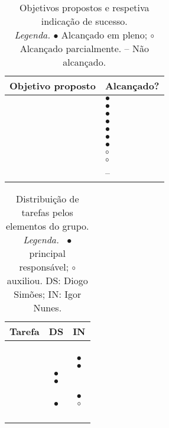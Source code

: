 \begin{table}[!htbp]
	\centering
	\begin{tabular}{p{} >{\centering\let\newline\\\arraybackslash\hspace{0pt}}m{}}
		\toprule
		{\bfseries Objetivo proposto} & {\bfseries Alcançado?} \\
		\midrule
		 & $\bullet$ \\
		 & $\bullet$ \\
		 & $\bullet$ \\
		 & $\bullet$ \\
		 & $\bullet$ \\
		 & $\bullet$ \\
		 & $\bullet$ \\
		 & $\circ$   \\
		 & $\circ$   \\
		 & --        \\
		\bottomrule
	\end{tabular}
	\caption[Objetivos propostos vs. alcançados]{
		Objetivos propostos e respetiva indicação de sucesso.\\
		\textit{Legenda.} $\bullet$ Alcançado em pleno; $\circ$ Alcançado parcialmente. -- Não alcançado.
	}
	\label{tab::objetivos}
\end{table}


\begin{table}[!htbp]
	\centering
	\begin{tabular}{l c c}
		\toprule
		\textbf{Tarefa} & \textbf{DS} & \textbf{IN} \\
		\midrule
		 &             &             \\
		 &             &             \\
		 &             &             \\
		 &             &             \\
		 &             & $\bullet$   \\
		 &             & $\bullet$   \\
		 & $\bullet$   &             \\
		 & $\bullet$   &             \\
		 &             &             \\
		 &             &             \\
		 &             & $\bullet$   \\
		 & $\bullet$   & $\circ$     \\
		 &             &             \\
		 &             &             \\
		 &             &             \\
		 &             &             \\
		\bottomrule
	\end{tabular}
	\caption[Distribuição de tarefas]{
		Distribuição de tarefas pelos elementos do grupo.\\
		\textit{Legenda.}~%
		$\bullet$ principal responsável; $\circ$ auxiliou.
		DS: Diogo Simões; IN: Igor Nunes.
	}
	\label{tab::divisao-trabalho}
\end{table}


